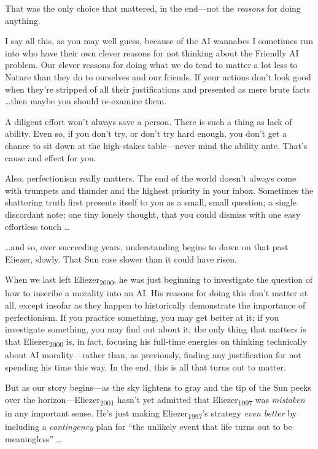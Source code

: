 {
 That was the only choice that mattered, in the end---not the
\textit{reasons} for doing anything.}

{
 I say all this, as you may well guess, because of the AI wannabes
I sometimes run into who have their own clever reasons for not thinking
about the Friendly AI problem. Our clever reasons for doing what we do
tend to matter a lot less to Nature than they do to ourselves and our
friends. If your actions don't look good when
they're stripped of all their justifications and
presented as mere brute facts \ldots then maybe you should re-examine
them.}

{
 A diligent effort won't always save a person.
There is such a thing as lack of ability. Even so, if you
don't try, or don't try hard enough,
you don't get a chance to sit down at the high-stakes
table---never mind the ability ante. That's cause and
effect for you.}

{
 Also, perfectionism really matters. The end of the world
doesn't always come with trumpets and thunder and the
highest priority in your inbox. Sometimes the shattering truth first
presents itself to you as a small, small question; a single discordant
note; one tiny lonely thought, that you could dismiss with one easy
effortless touch \ldots}

{
 \ldots and so, over succeeding years, understanding begins to dawn
on that past Eliezer, slowly. That Sun rose slower than it could have
risen.}

\myendsectiontext


{
 When we last left Eliezer\textsubscript{2000}, he was just
beginning to investigate the question of how to inscribe a morality
into an AI. His reasons for doing this don't matter at
all, except insofar as they happen to historically demonstrate the
importance of perfectionism. If you practice something, you may get
better at it; if you investigate something, you may find out about it;
the only thing that matters is that Eliezer\textsubscript{2000} is, in
fact, focusing his full-time energies on thinking technically about AI
morality---rather than, as previously, finding any justification for
not spending his time this way. In the end, this is all that turns out
to matter. }

{
 But as our story begins---as the sky lightens to gray and the tip
of the Sun peeks over the horizon---Eliezer\textsubscript{2001}
hasn't yet admitted that Eliezer\textsubscript{1997}
was \textit{mistaken} in any important sense. He's just
making Eliezer\textsubscript{1997}'s strategy
\textit{even better} by including a \textit{contingency} plan for
``the unlikely event that life turns out to be
meaningless'' \ldots}

